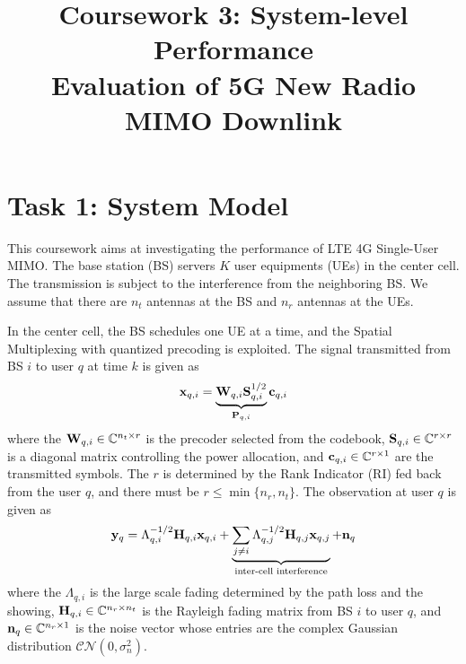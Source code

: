 \documentclass[10pt,conference]{IEEEtran}
\begin{document}
\title{\textbf{Coursework 3}: System-level Performance\\
Evaluation of 5G New Radio MIMO Downlink
}

\author{}

\maketitle

\section{Task 1: System Model}
This coursework aims at investigating the performance of LTE 4G Single-User
MIMO. The base station (BS) servers $K$ user equipments (UEs) in the center
cell. The transmission is subject to the interference from the neighboring BS.
We assume that there are $n_t$ antennas at the BS and $n_r$ antennas at the 
UEs.

In the center cell, the BS schedules one UE at a time, and the Spatial Multiplexing
with quantized precoding is exploited. The signal transmitted from BS $i$
to user $q$ at time $k$ is given as
\begin{equation}
    {\bf{x}}_{q,i} = \underbrace{{\bf{W}}_{q,i} {\bf{S}}_{q,i}^{1/2}}_{{\bf{P}}_{q,i}} {\bf{c}}_{q,i} \label{eq1}
\end{equation}
where the ${\bf{W}}_{q,i} \in {\mathbb{C}}^{n_t \times r}$ is the precoder
selected from the codebook, ${\bf{S}}_{q,i} \in {\mathbb{C}}^{r \times r}$ 
is a diagonal matrix controlling the power allocation, and ${\bf{c}}_{q,i} \in {\mathbb{C}}^{r \times 1}$
are the transmitted symbols. The $r$ is determined by the Rank Indicator (RI)
fed back from the user $q$, and there must be $r \leq \min\{n_r,n_t\}$. 
The observation at user $q$ is given as 
\begin{equation}
    {\bf{y}}_{q} = \Lambda_{q,i}^{-1/2} {\bf{H}}_{q,i} {\bf{x}}_{q,i} + \underbrace{\sum_{j \neq i} \Lambda_{q,j}^{-1/2} {\bf{H}}_{q,j} {\bf{x}}_{q,j}}_{\text{inter-cell interference}} + {\bf{n}}_{q} \label{eq2}
\end{equation}
where the $\Lambda_{q,i}$ is the large scale fading determined by the path loss
and the showing, ${\bf{H}}_{q,i} \in \mathbb{C}^{n_r \times n_t}$ is the 
Rayleigh fading matrix from BS $i$ to user $q$, and ${\bf{n}}_{q} \in \mathbb{C}^{n_r \times 1}$ 
is the noise vector whose entries are the complex Gaussian distribution 
$\mathcal{CN} (0,\sigma_n^2)$. 
\end{document}
